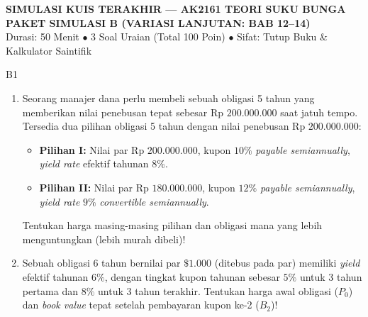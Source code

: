 \documentclass[11pt,a4paper]{article}
\begin{document}
\newpage

\begin{tcolorbox}[
    enhanced,
    colback=primaryblue,
    colframe=primaryblue,
    arc=2mm,
    left=4mm,right=4mm,top=3.5mm,bottom=3.5mm,
    boxrule=0pt
]
\begin{center}
    {\fontsize{14}{17}\selectfont\bfseries\color{white} SIMULASI KUIS TERAKHIR --- AK2161 TEORI SUKU BUNGA}\\[1mm]
    {\fontsize{12}{15}\selectfont\bfseries\color{amberbg} PAKET SIMULASI B (VARIASI LANJUTAN: BAB 12--14)}\\[1mm]
    {\fontsize{9.5}{12}\selectfont\color{white} Durasi: 50 Menit $\bullet$ 3 Soal Uraian (Total 100 Poin) $\bullet$ Sifat: Tutup Buku \& Kalkulator Saintifik}
\end{center}
\end{tcolorbox}

\begin{naskahsoalbox}{B1}
\begin{enumerate}[label=(\alph*), leftmargin=6mm, topsep=1pt, itemsep=2pt]
    \item Seorang manajer dana perlu membeli sebuah obligasi 5 tahun yang memberikan nilai penebusan tepat sebesar $\text{Rp }200.000.000$ saat jatuh tempo. Tersedia dua pilihan obligasi 5 tahun dengan nilai penebusan $\text{Rp }200.000.000$:
    \begin{itemize}[leftmargin=5mm, topsep=1pt, itemsep=1pt]
        \item \textbf{Pilihan I:} Nilai par $\text{Rp }200.000.000$, kupon $10\%$ \textit{payable semiannually}, \textit{yield rate} efektif tahunan $8\%$.
        \item \textbf{Pilihan II:} Nilai par $\text{Rp }180.000.000$, kupon $12\%$ \textit{payable semiannually}, \textit{yield rate} $9\%$ \textit{convertible semiannually}.
    \end{itemize}
    Tentukan harga masing-masing pilihan dan obligasi mana yang lebih menguntungkan (lebih murah dibeli)!
    \item Sebuah obligasi 6 tahun bernilai par $\$1.000$ (ditebus pada par) memiliki \textit{yield} efektif tahunan $6\%$, dengan tingkat kupon tahunan sebesar $5\%$ untuk 3 tahun pertama dan $8\%$ untuk 3 tahun terakhir. Tentukan harga awal obligasi ($P_0$) dan \textit{book value} tepat setelah pembayaran kupon ke-2 ($B_2$)!
\end{enumerate}
\end{naskahsoalbox}
\end{document}
